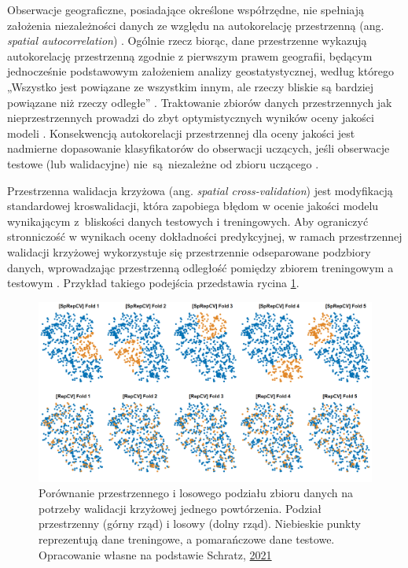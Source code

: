 \documentclass{amuthesis}
\begin{document}
Obserwacje geograficzne, posiadające określone współrzędne, nie
spełniają założenia niezależności danych ze względu na autokorelację
przestrzenną (ang. \emph{spatial autocorrelation})
\autocite{pohjankukka_2017_scv}. Ogólnie rzecz biorąc, dane przestrzenne
wykazują autokorelację przestrzenną zgodnie z pierwszym prawem
geografii, będącym jednocześnie podstawowym założeniem analizy
geostatystycznej, według którego „Wszystko jest powiązane ze wszystkim
innym, ale rzeczy bliskie są bardziej powiązane niż rzeczy odległe''
\autocite{tobler_1970_first_law_of_geography}. Traktowanie zbiorów
danych przestrzennych jak nieprzestrzennych prowadzi do zbyt
optymistycznych wyników oceny jakości modeli
\autocite{brenning_2005_scv}. Konsekwencją autokorelacji przestrzennej
dla oceny jakości jest nadmierne dopasowanie klasyfikatorów do
obserwacji uczących, jeśli obserwacje testowe (lub walidacyjne)
nie~są~niezależne od zbioru uczącego \autocite{brenning_2012_scv}.

Przestrzenna walidacja krzyżowa (ang. \emph{spatial cross-validation})
jest modyfikacją standardowej kroswalidacji, która zapobiega błędom w
ocenie jakości modelu wynikającym z~bliskości danych testowych i
treningowych. Aby ograniczyć stronniczość w wynikach oceny dokładności
predykcyjnej, w ramach przestrzennej walidacji krzyżowej wykorzystuje
się przestrzennie odseparowane podzbiory danych, wprowadzając
przestrzenną odległość pomiędzy zbiorem treningowym a testowym
\autocite{pohjankukka_2017_scv}. Przykład takiego podejścia przedstawia
rycina \ref{fig-rycina-spcv}.

\begin{figure}[t]

{\centering \includegraphics[width=1\textwidth,height=\textheight]{figures/spcv_plot.png}

}

\caption{\label{fig-rycina-spcv}Porównanie przestrzennego i losowego
podziału zbioru danych na potrzeby walidacji krzyżowej jednego
powtórzenia. Podział przestrzenny (górny rząd) i losowy (dolny rząd).
Niebieskie punkty reprezentują dane treningowe, a pomarańczowe dane
testowe. Opracowanie własne na podstawie Schratz,
\href{https://mlr.mlr-org.com/articles/tutorial/handling_of_spatial_data.html}{2021}}

\end{figure}
\end{document}
